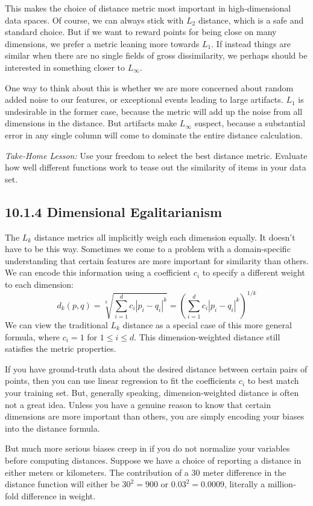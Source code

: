 \documentclass[10pt]{article}
\begin{document}
This makes the choice of distance metric most important in high-dimensional data spaces. Of course, we can always stick with $L_2$ distance, which is a safe and standard choice. But if we want to reward points for being close on many dimensions, we prefer a metric leaning more towards $L_1$. If instead things are similar when there are no single fields of gross dissimilarity, we perhaps should be interested in something closer to $L_{\infty}$.

One way to think about this is whether we are more concerned about random added noise to our features, or exceptional events leading to large artifacts. $L_1$ is undesirable in the former case, because the metric will add up the noise from all dimensions in the distance. But artifacts make $L_{\infty}$ suspect, because a substantial error in any single column will come to dominate the entire distance calculation.

\textit{Take-Home Lesson:} Use your freedom to select the best distance metric. Evaluate how well different functions work to tease out the similarity of items in your data set.

\subsection*{10.1.4 Dimensional Egalitarianism}
The $L_k$ distance metrics all implicitly weigh each dimension equally. It doesn’t have to be this way. Sometimes we come to a problem with a domain-specific understanding that certain features are more important for similarity than others. We can encode this information using a coefficient $c_i$ to specify a different weight to each dimension:
\[
d_{k}(p, q)=\sqrt[k]{\sum_{i=1}^{d} c_{i}\left|p_{i}-q_{i}\right|^{k}}=\left(\sum_{i=1}^{d} c_{i}\left|p_{i}-q_{i}\right|^{k}\right)^{1 / k}
\]
We can view the traditional $L_k$ distance as a special case of this more general formula, where $c_i = 1$ for $1 \leq i \leq d$. This dimension-weighted distance still satisfies the metric properties.

If you have ground-truth data about the desired distance between certain pairs of points, then you can use linear regression to fit the coefficients $c_i$ to best match your training set. But, generally speaking, dimension-weighted distance is often not a great idea. Unless you have a genuine reason to know that certain dimensions are more important than others, you are simply encoding your biases into the distance formula.

But much more serious biases creep in if you do not normalize your variables before computing distances. Suppose we have a choice of reporting a distance in either meters or kilometers. The contribution of a 30 meter difference in the distance function will either be $30^2 = 900$ or $0.03^2 = 0.0009$, literally a million-fold difference in weight.
\end{document}

